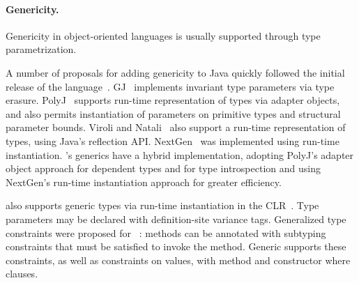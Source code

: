

\paragraph{Genericity.}

Genericity in object-oriented languages is usually
supported through
type parametrization.

A number of proposals 
for adding genericity to Java quickly followed
the initial release of
the language~\cite{GJ,Pizza,java-popl97,thorup97,allen03}.
GJ~\cite{GJ} implements invariant type
parameters via type erasure.
PolyJ~\cite{java-popl97} supports run-time representation of types
via adapter objects, and also permits instantiation of
parameters on primitive types and structural parameter bounds.
Viroli and Natali~\cite{reflective-generics,type-passing-generics}
also support
a run-time representation of types, using Java's reflection API.
NextGen~\cite{nextgen,allen03} was implemented using run-time 
instantiation.
\Xten{}'s generics have a hybrid implementation, adopting PolyJ's
adapter object approach for dependent types and for 
type introspection and using NextGen's run-time
instantiation approach for greater efficiency.

\csharp also supports generic types via run-time instantiation in the
CLR~\cite{csharp-generics}.  Type parameters may be declared
with definition-site variance tags.
Generalized type constraints were proposed for
\csharp~\cite{emir06}: methods can be annotated with subtyping
constraints that must be satisfied to invoke the method.
Generic \Xten{} supports these constraints, as well as constraints
on values, with method and constructor where clauses.



